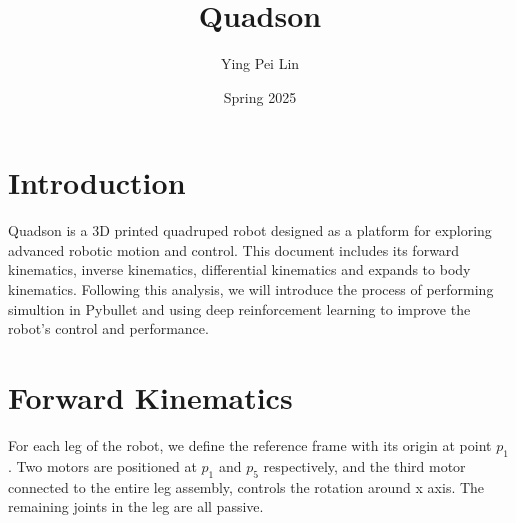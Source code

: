 \documentclass[a4paper,11pt]{article}
\begin{document}
	
\title{
	\textbf{Quadson}
}
\author{Ying Pei Lin}
\date{Spring 2025}
\maketitle

\section*{Introduction}

Quadson is a 3D printed quadruped robot designed as a platform for exploring advanced robotic motion and control.
This document includes its forward kinematics, inverse kinematics, differential kinematics and expands to body kinematics.
Following this analysis, we will introduce the process of performing simultion in Pybullet and using deep
reinforcement learning to improve the robot's control and performance.

\section*{Forward Kinematics}

For each leg of the robot, we define the reference frame with its origin at point $p_1$. 
Two motors are positioned at $p_1$ and $p_5$ respectively, and the third motor
connected to the entire leg assembly, controls the rotation around x axis. The remaining joints in the leg are all passive.
\end{document}
